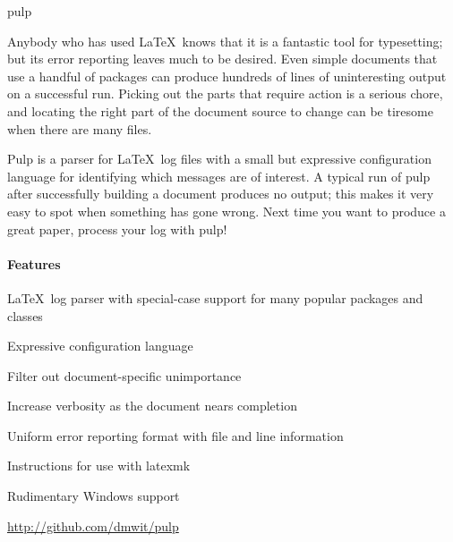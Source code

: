 \begin{hcarentry}[new]{pulp}
\makeheader

Anybody who has used \LaTeX\ knows that it is a fantastic tool for
typesetting; but its error reporting leaves much to be desired. Even simple
documents that use a handful of packages can produce hundreds of lines of
uninteresting output on a successful run. Picking out the parts that require
action is a serious chore, and locating the right part of the document
source to change can be tiresome when there are many files.

Pulp is a parser for \LaTeX\ log files with a small but expressive
configuration language for identifying which messages are of interest. A
typical run of pulp after successfully building a document produces no
output; this makes it very easy to spot when something has gone wrong. Next
time you want to produce a great paper, process your log with pulp!

\paragraph*{Features}
\begin{compactitem}
	\item \LaTeX\ log parser with special-case support for many popular
		packages and classes
	\item Expressive configuration language
		\begin{compactitem}
			\item Filter out document-specific unimportance
			\item Increase verbosity as the document nears completion
		\end{compactitem}
	\item Uniform error reporting format with file and line information
	\item Instructions for use with latexmk
	\item Rudimentary Windows support
\end{compactitem}

%
%
%
%

\FurtherReading
  \url{http://github.com/dmwit/pulp}
\end{hcarentry}
